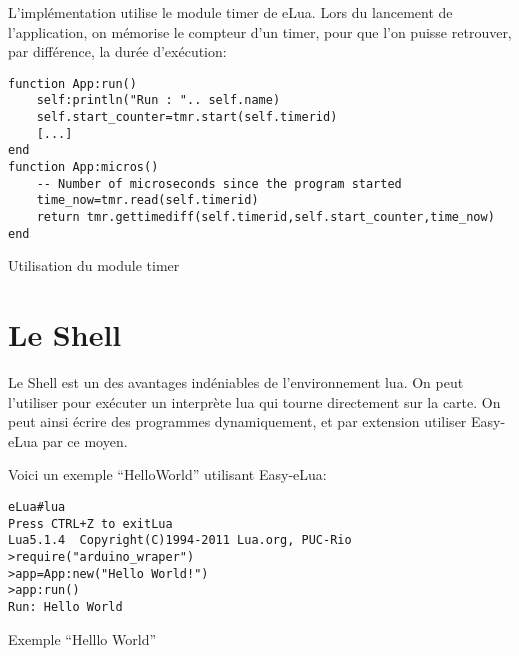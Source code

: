 L'implémentation utilise le module timer de eLua. Lors du lancement de l'application, 
on mémorise le compteur d’un timer, pour que l'on puisse retrouver, par différence, la durée d'exécution:

\begin{table}[h]
\begin{lstlisting}
function App:run()
    self:println("Run : ".. self.name)
    self.start_counter=tmr.start(self.timerid)
    [...]
end
function App:micros()
    -- Number of microseconds since the program started
    time_now=tmr.read(self.timerid)
    return tmr.gettimediff(self.timerid,self.start_counter,time_now)
end
\end{lstlisting}
\caption{Utilisation du module timer}
\end{table}

\section{Le Shell}

Le Shell est un des avantages indéniables de l'environnement lua. On peut l'utiliser pour exécuter un interprète 
lua qui tourne directement sur la carte. On peut ainsi écrire des programmes dynamiquement, et par extension utiliser Easy-eLua par ce moyen.

Voici un exemple ``HelloWorld'' utilisant Easy-eLua: 

\begin{table}[h]
\begin{lstlisting}
eLua#lua
Press CTRL+Z to exitLua
Lua5.1.4  Copyright(C)1994-2011 Lua.org, PUC-Rio
>require("arduino_wraper")
>app=App:new("Hello World!")
>app:run()
Run: Hello World
\end{lstlisting}
\caption{Exemple ``Helllo World''}
\end{table}





